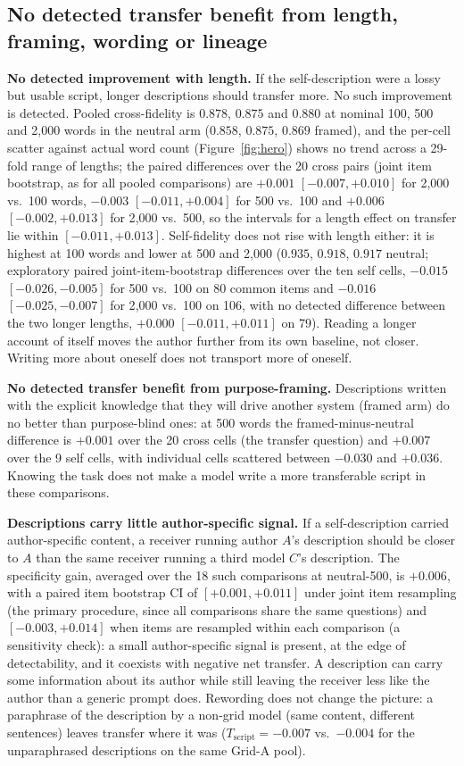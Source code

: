 \documentclass[11pt]{article}
\newcommand{\Tscript}{T_{\mathrm{script}}}
\begin{document}
\subsection{No detected transfer benefit from length, framing, wording or
lineage}
\textbf{No detected improvement with length.} If the self-description were
a lossy but usable script, longer descriptions should transfer more. No such
improvement is detected.
Pooled cross-fidelity is $0.878$, $0.875$ and $0.880$ at nominal 100, 500 and
2{,}000 words in the neutral arm ($0.858$, $0.875$, $0.869$ framed), and the
per-cell scatter against actual word count (Figure~\ref{fig:hero}) shows no
trend across a 29-fold range of lengths; the paired differences over the 20
cross pairs (joint item bootstrap, as for all pooled comparisons) are
$+0.001$ $[-0.007, +0.010]$ for 2{,}000 vs.\ 100 words, $-0.003$
$[-0.011, +0.004]$ for 500 vs.\ 100 and $+0.006$ $[-0.002, +0.013]$ for
2{,}000 vs.\ 500, so the intervals for a length effect on transfer lie
within $[-0.011, +0.013]$. Self-fidelity does not rise with length either:
it is highest at 100 words and lower at 500 and 2{,}000 ($0.935$, $0.918$,
$0.917$ neutral; exploratory paired joint-item-bootstrap differences over
the ten self cells, $-0.015$ $[-0.026, -0.005]$ for 500 vs.\ 100 on 80
common items and $-0.016$ $[-0.025, -0.007]$ for 2{,}000 vs.\ 100 on 106,
with no detected difference between the two longer lengths, $+0.000$
$[-0.011, +0.011]$ on 79). Reading a longer account of
itself moves the author further from its own baseline, not closer. Writing
more about oneself does not transport more of oneself.

\textbf{No detected transfer benefit from purpose-framing.} Descriptions written with the
explicit knowledge that they will drive another system (framed arm) do no
better than purpose-blind ones: at 500 words the framed-minus-neutral
difference is $+0.001$ over the 20 cross cells (the transfer question) and
$+0.007$ over the 9 self cells, with individual cells scattered between
$-0.030$ and $+0.036$. Knowing the task does not make a model write a more
transferable script in these comparisons.

\textbf{Descriptions carry little author-specific signal.} If a
self-description carried author-specific content, a receiver running author
$A$'s description should be closer to $A$ than the same receiver running a
third model $C$'s description. The specificity gain, averaged over the 18
such comparisons at neutral-500, is $+0.006$, with a paired item bootstrap
CI of $[+0.001, +0.011]$ under joint item resampling (the primary
procedure, since all comparisons share the same questions) and
$[-0.003, +0.014]$ when items are resampled within each comparison (a
sensitivity check): a small author-specific signal is present, at the edge
of detectability, and it coexists with negative net transfer. A description can carry some
information about its author while still leaving the receiver less like the
author than a generic prompt does. Rewording does not change the picture: a paraphrase of
the description by a non-grid model (same content, different sentences)
leaves transfer where it was ($\Tscript = -0.007$ vs.\ $-0.004$ for the
unparaphrased descriptions on the same Grid-A pool).
\end{document}
